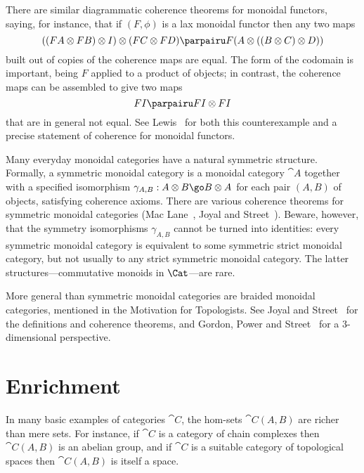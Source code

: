 There are similar diagrammatic coherence theorems for monoidal functors,
saying, for instance, that if $(F, \phi)$ is a lax monoidal functor then
any two maps
\[
((FA \otimes FB) \otimes I) \otimes (FC \otimes FD)
\parpairu
F(A \otimes ((B\otimes C) \otimes D))
\]
built out of copies of the coherence maps are equal.  The form of the
codomain is important, being $F$ applied to a product of objects; in
contrast, the coherence maps can be assembled to give two maps
\[
FI 
\parpairu 
FI \otimes FI
\]
that are in general not equal.  See Lewis~\cite{Lew}%
%
%
for both this
counterexample and a precise statement of coherence for monoidal functors.

Many everyday monoidal categories have a natural symmetric structure.
Formally, a symmetric monoidal category is a monoidal category $\cat{A}$
together with a specified isomorphism $\gamma_{A, B}: A \otimes B \go B
\otimes A$ for each pair $(A, B)$ of objects, satisfying coherence axioms.
There are various coherence theorems for symmetric monoidal categories
(Mac%
%
%
Lane~\cite{MacNAC}, Joyal and Street~\cite{JSBTC}).  Beware, however, that
the symmetry isomorphisms $\gamma_{A, B}$ cannot be turned into identities:
every symmetric monoidal category is equivalent to some symmetric strict
monoidal category, but not usually to any strict symmetric monoidal
category.  The latter structures---commutative monoids in $\Cat$---are
rare.%
%
%

More general than symmetric monoidal categories are braided%
%
%
monoidal
categories, mentioned in the Motivation for Topologists.  See Joyal%
%
% 
and
Street~\cite{JSBTC}%
%
% 
for the definitions and coherence theorems, and
Gordon,%
%
%
%
%
Power and Street~\cite{GPS} for a 3-dimensional perspective.



\section{Enrichment}

In many basic examples of categories $\cat{C}$, the hom-sets $\cat{C}(A,
B)$ are richer than mere sets.  For instance, if $\cat{C}$ is a category of
chain complexes then $\cat{C}(A, B)$ is an abelian group, and if $\cat{C}$
is a suitable category of topological spaces then $\cat{C}(A, B)$ is itself
a space.

